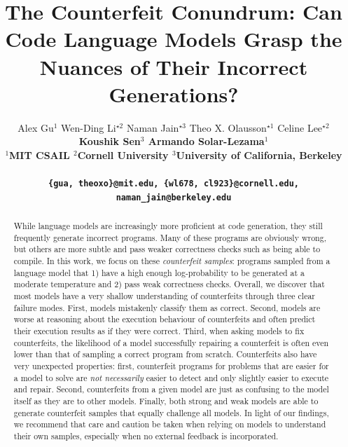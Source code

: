 \documentclass[11pt]{article}
\title{The Counterfeit Conundrum: Can Code Language Models Grasp the Nuances of Their Incorrect Generations?}
\author{Alex Gu$^1$ \quad Wen-Ding Li$^{\star 2}$ \quad Naman Jain$^{\star 3}$ \quad Theo X. Olausson$^{\star 1}$ \quad Celine Lee$^{\star 2}$ \\ \bf Koushik Sen$^3$ \quad Armando Solar-Lezama$^1$ \\
$^1$MIT CSAIL $^2$Cornell University $^3$University of California, Berkeley \\ \\
\texttt{\{gua, theoxo\}@mit.edu, \{wl678, cl923\}@cornell.edu, naman\_jain@berkeley.edu}
}
\begin{document}
\maketitle
\begin{abstract}
While language models are increasingly more proficient at code generation, they still frequently generate incorrect programs. Many of these programs are obviously wrong, but others are more subtle and pass weaker correctness checks such as being able to compile. In this work, we focus on these \textit{counterfeit samples}: programs sampled from a language model that 1) have a high enough log-probability to be generated at a moderate temperature and 2) pass weak correctness checks. Overall, we discover that most models have a very shallow understanding of counterfeits through three clear failure modes. First, models mistakenly classify them as correct. Second, models are worse at reasoning about the execution behaviour of counterfeits and often predict their execution results as if they were correct. Third, when asking models to fix counterfeits, the likelihood of a model successfully repairing a counterfeit is often even lower than that of sampling a correct program from scratch. Counterfeits also have very unexpected properties: first, counterfeit programs for problems that are easier for a model to solve are \textit{not necessarily} easier to detect and only slightly easier to execute and repair. Second, counterfeits from a given model are just as confusing to the model itself as they are to other models. Finally, both strong and weak models are able to generate counterfeit samples that equally challenge all models. In light of our findings, we recommend that care and caution be taken when relying on models to understand their own samples, especially when no external feedback is incorporated.
\end{abstract}

% 

% 

% 

% 




\newpage



\appendix
\onecolumn
\raggedbottom





\end{document}
